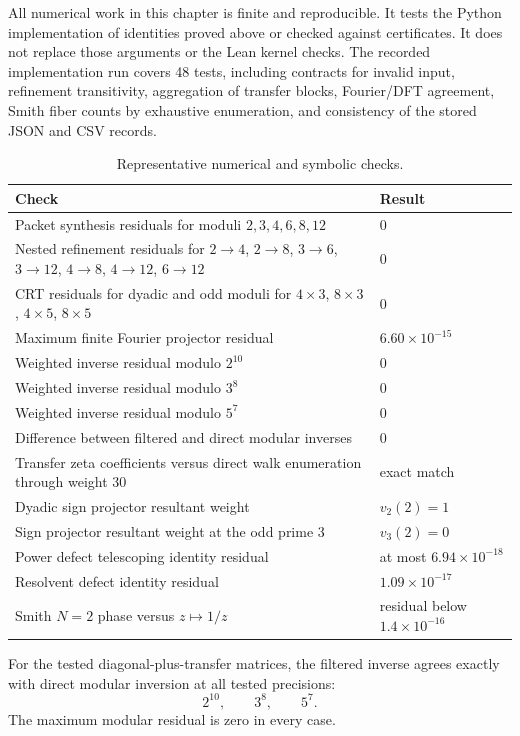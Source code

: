 All numerical work in this chapter is finite and reproducible. It tests the
Python implementation of identities proved above or checked against
certificates. It does not replace those arguments or the Lean kernel checks.
The recorded implementation run covers 48 tests, including contracts for invalid input, refinement
transitivity, aggregation of transfer blocks, Fourier/DFT agreement, Smith
fiber counts by exhaustive enumeration, and consistency of the stored JSON
and CSV records.

\begin{table}[htbp]
\centering
\caption{Representative numerical and symbolic checks.}
\begin{tabularx}{\textwidth}{L{0.54\textwidth}Y}
\toprule
Check & Result \\
\midrule
Packet synthesis residuals for moduli $2,3,4,6,8,12$ & $0$ \\
Nested refinement residuals for $2\to4$, $2\to8$, $3\to6$, $3\to12$, $4\to8$, $4\to12$, $6\to12$ & $0$ \\
CRT residuals for dyadic and odd moduli for $4\times3$, $8\times3$, $4\times5$, $8\times5$ & $0$ \\
Maximum finite Fourier projector residual & $6.60\times10^{-15}$ \\
Weighted inverse residual modulo $2^{10}$ & $0$ \\
Weighted inverse residual modulo $3^8$ & $0$ \\
Weighted inverse residual modulo $5^7$ & $0$ \\
Difference between filtered and direct modular inverses & $0$ \\
Transfer zeta coefficients versus direct walk enumeration through weight $30$ & exact match \\
Dyadic sign projector resultant weight & $v_2(2)=1$ \\
Sign projector resultant weight at the odd prime $3$ & $v_3(2)=0$ \\
Power defect telescoping identity residual & at most $6.94\times10^{-18}$ \\
Resolvent defect identity residual & $1.09\times10^{-17}$ \\
Smith $N=2$ phase versus $z\mapsto1/z$ & residual below $1.4\times10^{-16}$ \\
\bottomrule
\end{tabularx}
\end{table}

\begin{certificate}
For the tested diagonal-plus-transfer matrices, the filtered inverse agrees exactly with direct modular inversion at all tested precisions:
\[
2^{10},\qquad3^8,\qquad5^7.
\]
The maximum modular residual is zero in every case.
\end{certificate}

